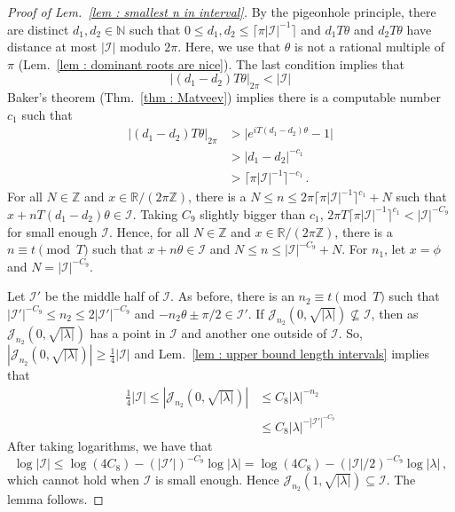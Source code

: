 \documentclass[a4paper,UKenglish,cleveref, autoref, thm-restate]{lipics-v2021}
\newcommand{\nat} {\mathbb{N}}
\begin{document}
\begin{proof}[Proof of Lem.~\ref{lem : smallest n in interval}]
    By the pigeonhole principle, there are distinct $d_1, d_2 \in \nat$ such that $0 \le d_1, d_2 \le \lceil \pi|\mathcal{I}|^{-1} \rceil$ and $d_1 T\theta$ and $d_2T\theta$ have distance at most $|\mathcal{I}|$ modulo $2\pi$. 
    Here, we use that $\theta$ is not a rational multiple of $\pi$ (Lem.~\ref{lem : dominant roots are nice}).
    The last condition implies that
    \begin{equation*}
         \big| (d_1-d_2)T\theta\big|_{2\pi} < |\mathcal{I}|
    \end{equation*}
    Baker's theorem (Thm.~\ref{thm : Matveev}) implies there is a computable number $c_1$ such that
    \begin{align*}
          \big| (d_1-d_2)T\theta\big|_{2\pi} 
          &> \big|e^{iT(d_1-d_2)\theta} - 1\big| \\
          &> |d_1 - d_2|^{-c_1} \\
          &> \big\lceil\pi|\mathcal{I}|^{-1}\big\rceil^{-c_1} \, .
    \end{align*}
    For all $N \in \mathbb{Z}$ and $x \in \mathbb{R} /(2\pi\mathbb{Z})$, there is a $N \le n \le 2\pi \lceil \pi|\mathcal{I}|^{-1} \rceil^{c_1} + N$ such that $x + nT(d_1-d_2) \theta \in \mathcal{I}$. 
    Taking $C_9$ slightly bigger than $c_1$, $ 2\pi T \lceil \pi|\mathcal{I}|^{-1} \rceil^{c_1} < |\mathcal{I}|^{-C_9}$ for small enough $\mathcal{I}$. 
    Hence, for all $N \in \mathbb{Z}$ and $x \in \mathbb{R} /(2\pi\mathbb{Z})$, there is a $n \equiv t \pmod T$ such that $x + n\theta\in\mathcal{I}$ and $N \le n \le |\mathcal{I}|^{-C_9} + N$. 
    For $n_1$, let $x = \phi$ and $N = |\mathcal{I}|^{-C_9}$.

    Let $\mathcal{I}'$ be the middle half of $\mathcal{I}$. 
    As before, there is an $n_2 \equiv t \pmod{T}$ such that
    $|\mathcal{I}'|^{-C_9} \le n_2 \le 2|\mathcal{I}'|^{-C_9}$ and $-n_2\theta \pm \pi/2 \in \mathcal{I}'$. 
    If $\mathcal{J}_{n_2}(0, \sqrt{|\lambda|}) \not\subseteq\mathcal{I}$, then as $\mathcal{J}_{n_2}(0, \sqrt{|\lambda|})$ has a point in $\mathcal{I}$ and another one outside of $\mathcal{I}$.
    So, $|\mathcal{J}_{n_2}(0, \sqrt{|\lambda|})| \ge \frac{1}{4}|\mathcal{I}|$ and 
    Lem.~\ref{lem : upper bound length intervals} implies that
    \begin{align*}
        \frac{1}{4}|\mathcal{I}| \le |\mathcal{J}_{n_2}(0, \sqrt{|\lambda|})| &\le C_8|\lambda|^{-n_2} \\
        &\le C_8|\lambda|^{-|\mathcal{I}'|^{-C_9}} 
    \end{align*}
    After taking logarithms, we have that
    \begin{equation*}
        \log|\mathcal{I}| \le \log(4C_8) - (|\mathcal{I}'|)^{-C_9}\log|\lambda|= \log(4C_8) - (|\mathcal{I}|/2)^{-C_9}\log|\lambda|\,,
    \end{equation*}
    which cannot hold when $\mathcal{I}$ is small enough.
    Hence $\mathcal{J}_{n_2}(1, \sqrt{|\lambda|}) \subseteq \mathcal{I}$.
    The lemma follows.
\end{proof}
\end{document}
